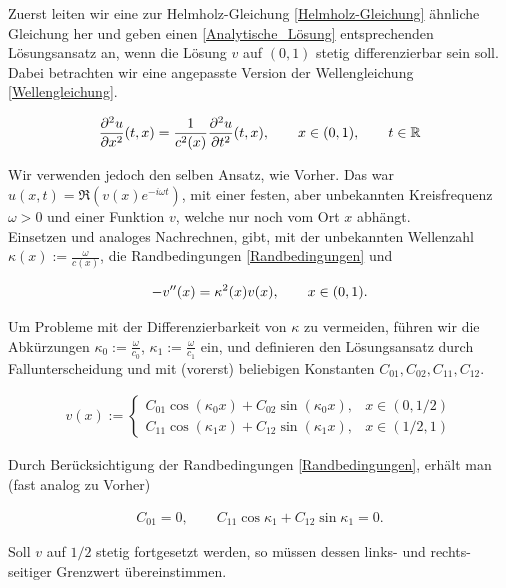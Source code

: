Zuerst leiten wir eine zur Helmholz-Gleichung \eqref{Helmholz-Gleichung} ähnliche Gleichung her und geben einen \eqref{Analytische_Lösung} entsprechenden Lösungsansatz an, wenn die Lösung $v$ auf $(0, 1)$ stetig differenzierbar sein soll.
Dabei betrachten wir eine angepasste Version der Wellengleichung \eqref{Wellengleichung}.

\begin{align*}
  \frac{\partial^2 u}{\partial x^2} (t, x) =
  \frac{1}{c^2(x)}
  \frac{\partial^2 u}{\partial t^2} (t, x), \qquad
  x \in (0, 1), \qquad
  t \in \mathbb{R}
\end{align*}

Wir verwenden jedoch den selben Ansatz, wie Vorher. Das war $u(x, t) = \Re (v(x) e^{-i \omega t})$, mit einer festen, aber unbekannten Kreisfrequenz $\omega > 0$ und einer Funktion $v$, welche nur noch vom Ort $x$ abhängt. \\

Einsetzen und analoges Nachrechnen, gibt, mit der unbekannten Wellenzahl $\kappa(x) := \frac{\omega}{c(x)}$, die Randbedingungen \eqref{Randbedingungen} und

\begin{align*}
  -v^{\prime \prime}(x) = \kappa^2(x) v(x), \qquad
  x \in (0, 1).
\end{align*}

Um Probleme mit der Differenzierbarkeit von $\kappa$ zu vermeiden, führen wir die Abkürzungen $\kappa_0 := \frac{\omega}{c_0}$, $\kappa_1 := \frac{\omega}{c_1}$ ein, und definieren den Lösungsansatz durch Fallunterscheidung und mit (vorerst) beliebigen Konstanten $C_{01}, C_{02}, C_{11}, C_{12}$.

\begin{align*}
  v(x) :=
  \begin{cases}
    C_{01} \cos{(\kappa_0 x)} + C_{02} \sin{(\kappa_0 x)},
    & x \in (0, 1/2) \\
    C_{11} \cos{(\kappa_1 x)} + C_{12} \sin{(\kappa_1 x)},
    & x \in (1/2, 1)
  \end{cases}
\end{align*}

Durch Berücksichtigung der Randbedingungen \eqref{Randbedingungen}, erhält man (fast analog zu Vorher)

\begin{align*}
  C_{01} = 0, \qquad
  C_{11} \cos{\kappa_1} + C_{12} \sin{\kappa_1} = 0.
\end{align*}

Soll $v$ auf $1/2$ stetig fortgesetzt werden, so müssen dessen links- und rechts-seitiger Grenzwert übereinstimmen.


